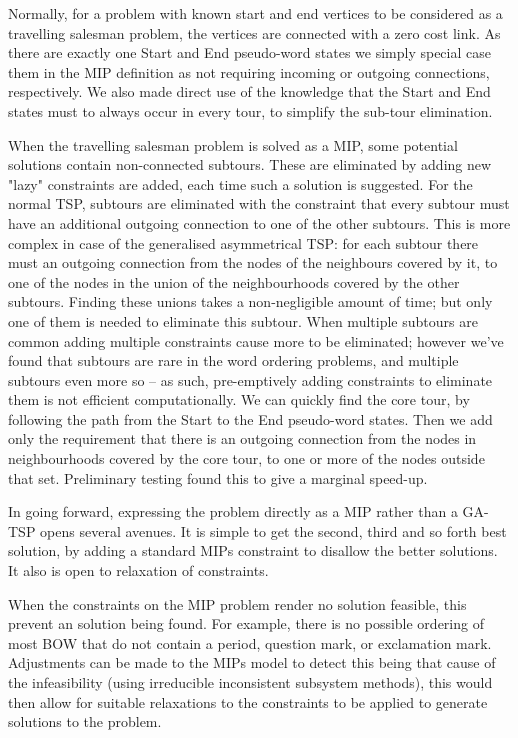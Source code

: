 \documentclass[11pt]{article}
\theoremstyle{plain}
\theoremstyle{definition}
\begin{document}
Normally, for a problem with known start and end vertices to be considered as a travelling salesman problem, the vertices are connected with a zero cost link. As there are exactly one Start and End pseudo-word states we simply special case them in the MIP definition as not requiring incoming or outgoing connections, respectively. We also made direct use of the knowledge that the Start and End states must to always occur in every tour, to simplify the sub-tour elimination. 

When the travelling salesman problem is solved as a MIP,  some potential solutions contain non-connected subtours. These are eliminated by adding new "lazy" constraints are added, each time such a solution is suggested. For the normal TSP, subtours are eliminated with the constraint that every subtour must have an additional outgoing connection to one of the other subtours. This is more complex in case of the generalised asymmetrical TSP: for each subtour there must an outgoing connection from the nodes of the neighbours covered by it, to one of the nodes in the union of the neighbourhoods covered by the other subtours. Finding these unions takes a non-negligible amount of time; but only one of them is needed to eliminate this subtour. When multiple subtours are common adding multiple constraints cause more to be eliminated; however we've found that subtours are rare in the word ordering problems, and multiple subtours even more so -- as such, pre-emptively adding constraints to eliminate them is not efficient computationally. We can quickly find the core tour, by following the path from the Start to the End pseudo-word states. Then we add only the requirement that there is an outgoing connection from the nodes in neighbourhoods covered by the core tour, to one or more of the nodes outside that set. Preliminary testing found this to give a marginal speed-up.

In going forward, expressing the problem directly as a MIP rather than a GA-TSP opens several avenues. It is simple to get the second, third and so forth best solution, by adding a standard MIPs constraint to disallow the better solutions. It also is open to relaxation of constraints. 

When the constraints on the MIP problem render no solution feasible, this prevent an solution being found. For example, there is no possible ordering of most BOW that do not contain a period, question mark, or exclamation mark. Adjustments can be made to the MIPs model to detect this being that cause of the infeasibility (using irreducible inconsistent subsystem methods), this would then allow for suitable relaxations to the constraints to be applied to generate solutions to the problem.
\end{document}
